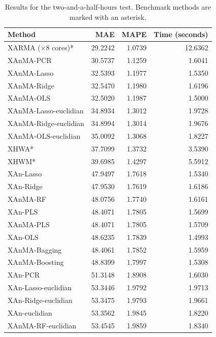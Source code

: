 \documentclass[journal, twoside]{IEEEtran}
\begin{document}
\begin{table}
\centering
\caption{Results for the two-and-a-half-hours test. Benchmark methods are marked with an asterisk.}
\label{tab:table_results_2_hour}
\footnotesize
\begin{tabular}{lrrr}
\hline
 Method &      MAE &   MAPE &       Time (seconds) \\
\hline
XARMA ($\times 8$ cores)* &  29.2242 & 1.0739 & 12.6362 \\
               XAnMA-PCR &  30.5737 & 1.1259 &  1.6041 \\
             XAnMA-Lasso &  32.5393 & 1.1977 &  1.5350 \\
             XAnMA-Ridge &  32.5470 & 1.1980 &  1.6196 \\
               XAnMA-OLS &  32.5020 & 1.1987 &  1.5000 \\
         XAnMA-Lasso-euclidian &  34.8934 & 1.3012 &  1.9728 \\
         XAnMA-Ridge-euclidian &  34.8994 & 1.3014 &  1.9676 \\
           XAnMA-OLS-euclidian &  35.0092 & 1.3068 &  1.8227 \\
                    XHWA* &  37.7099 & 1.3732 &  3.5390 \\
                    XHWM* &  39.6985 & 1.4297 &  5.5912 \\
               XAn-Lasso &  47.9497 & 1.7618 &  1.5340 \\
               XAn-Ridge &  47.9530 & 1.7619 &  1.6186 \\
                XAnMA-RF &  48.0756 & 1.7740 &  1.6161 \\
                 XAn-PLS &  48.4071 & 1.7805 &  1.5699 \\
               XAnMA-PLS &  48.4071 & 1.7805 &  1.5709 \\
                 XAn-OLS &  48.6235 & 1.7839 &  1.4993 \\
              XAnMA-Bagging &  48.4061 & 1.7852 &  1.5959 \\
             XAnMA-Boosting &  48.8399 & 1.7997 &  1.5308 \\
                 XAn-PCR &  51.3148 & 1.8908 &  1.6030 \\
           XAn-Lasso-euclidian &  53.3446 & 1.9792 &  1.9713 \\
           XAn-Ridge-euclidian &  53.3475 & 1.9793 &  1.9661 \\
                 XAn-euclidian &  53.3562 & 1.9845 &  1.8220 \\
            XAnMA-RF-euclidian &  53.4545 & 1.9859 &  1.8340 \\

\end{tabular}
\end{table}
\end{document}
